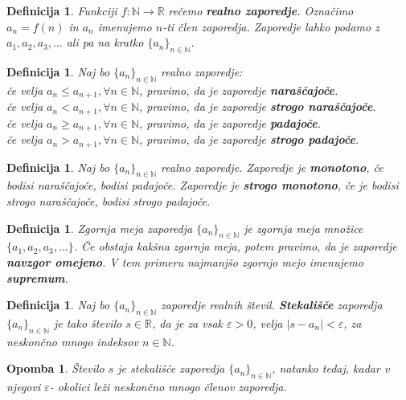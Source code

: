 \documentclass[11pt]{article}
\newtheorem{Definicija}[Izrek]{{\sc Definicija}}
\newtheorem{Opomba}[Izrek]{{\sc Opomba}}
\begin{document}
\begin{Definicija}
	Funkciji $f: \mathbb{N}\to \mathbb{R}$ rečemo \textbf{realno zaporedje}. Označimo $a_n = f(n)$ in $a_n$ imenujemo $n$-ti člen zaporedja. Zaporedje lahko podamo z $a_1, a_2, a_3,...$ ali pa na kratko $\{a_n\}_{n\in \mathbb{N}}$.
\end{Definicija}

\begin{Definicija}
	Naj bo $\{a_n\}_{n\in \mathbb{N}}$ realno zaporedje:
	\\
	\indent če velja $a_n \le a_{n+1},\forall n \in \mathbb{N}$, pravimo, da je zaporedje \textbf{naraščajoče}.
	\\
	\indent	če velja $a_n < a_{n+1},\forall n \in \mathbb{N}$, pravimo, da je zaporedje \textbf{strogo naraščajoče}.
	\\
	\indent če velja $a_n \ge a_{n+1},\forall n \in \mathbb{N}$, pravimo, da je zaporedje \textbf{padajoče}.
	\\
	\indent če velja $a_n > a_{n+1},\forall n \in \mathbb{N}$, pravimo, da je zaporedje \textbf{strogo padajoče}.
\end{Definicija}

\begin{Definicija}
	Naj bo $\{a_n\}_{n\in \mathbb{N}}$ realno zaporedje. Zaporedje je \textbf{monotono}, če bodisi naraščajoče, bodisi padajoče.
	Zaporedje je \textbf{strogo monotono}, če je bodisi strogo naraščajoče, bodisi strogo padajoče.
\end{Definicija}

\begin{Definicija}
	Zgornja meja zaporedja $\{a_n\}_{n\in \mathbb{N}}$ je zgornja meja množice $\{a_1, a_2,a_3,...\}$. Če obstaja kakšna zgornja meja, potem pravimo, da je zaporedje \textbf{navzgor omejeno}. V tem primeru najmanjšo zgornjo mejo imenujemo \textbf{supremum}.
\end{Definicija}

\begin{Definicija}
		Naj bo $\{a_n\}_{n\in \mathbb{N}}$ zaporedje realnih števil. \textbf{Stekališče} zaporedja  $\{a_n\}_{n\in \mathbb{N}}$ je tako število $s \in \mathbb{R}$, da je za vsak $\varepsilon > 0$, velja $| s - a_n | < \varepsilon$, za neskončno mnogo indeksov $n\in\mathbb{N}$.
\end{Definicija}
\begin{Opomba}
	Število $s$ je stekališče zaporedja $\{a_n\}_{n\in \mathbb{N}}$, natanko tedaj, kadar v njegovi $\varepsilon$- okolici leži neskončno mnogo členov zaporedja.
\end{Opomba}
\end{document}
